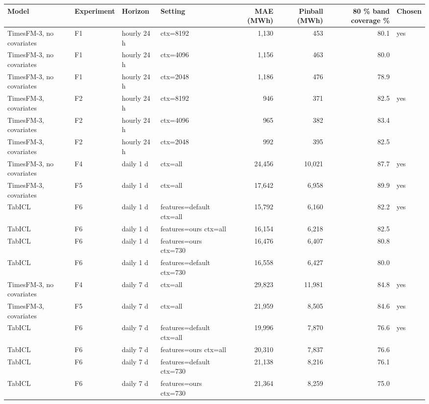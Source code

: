 \begin{tabular}{llllrrrl}
\toprule
Model & Experiment & Horizon & Setting & MAE (MWh) & Pinball (MWh) & 80 \% band coverage \% & Chosen \\
\midrule
TimesFM-3, no covariates & F1 & hourly 24 h & ctx=8192 & 1,130 & 453 & 80.1 & yes \\
TimesFM-3, no covariates & F1 & hourly 24 h & ctx=4096 & 1,156 & 463 & 80.0 &  \\
TimesFM-3, no covariates & F1 & hourly 24 h & ctx=2048 & 1,186 & 476 & 78.9 &  \\
TimesFM-3, covariates & F2 & hourly 24 h & ctx=8192 & 946 & 371 & 82.5 & yes \\
TimesFM-3, covariates & F2 & hourly 24 h & ctx=4096 & 965 & 382 & 83.4 &  \\
TimesFM-3, covariates & F2 & hourly 24 h & ctx=2048 & 992 & 395 & 82.5 &  \\
TimesFM-3, no covariates & F4 & daily 1 d & ctx=all & 24,456 & 10,021 & 87.7 & yes \\
TimesFM-3, covariates & F5 & daily 1 d & ctx=all & 17,642 & 6,958 & 89.9 & yes \\
TabICL & F6 & daily 1 d & features=default ctx=all & 15,792 & 6,160 & 82.2 & yes \\
TabICL & F6 & daily 1 d & features=ours ctx=all & 16,154 & 6,218 & 82.5 &  \\
TabICL & F6 & daily 1 d & features=ours ctx=730 & 16,476 & 6,407 & 80.8 &  \\
TabICL & F6 & daily 1 d & features=default ctx=730 & 16,558 & 6,427 & 80.0 &  \\
TimesFM-3, no covariates & F4 & daily 7 d & ctx=all & 29,823 & 11,981 & 84.8 & yes \\
TimesFM-3, covariates & F5 & daily 7 d & ctx=all & 21,959 & 8,505 & 84.6 & yes \\
TabICL & F6 & daily 7 d & features=default ctx=all & 19,996 & 7,870 & 76.6 & yes \\
TabICL & F6 & daily 7 d & features=ours ctx=all & 20,310 & 7,837 & 76.6 &  \\
TabICL & F6 & daily 7 d & features=default ctx=730 & 21,138 & 8,216 & 76.1 &  \\
TabICL & F6 & daily 7 d & features=ours ctx=730 & 21,364 & 8,259 & 75.0 &  \\
\bottomrule
\end{tabular}
